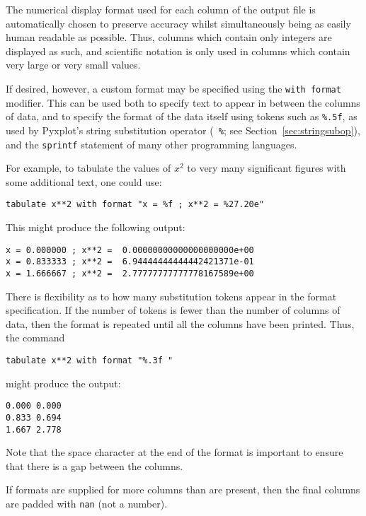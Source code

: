 The numerical display format used for each column of the output file is
automatically chosen to preserve accuracy whilst simultaneously being as easily
human readable as possible.  Thus, columns which contain only integers are
displayed as such, and scientific notation is only used in columns which
contain very large or very small values.

If desired, however, a custom format may be specified using the {\tt with
format} modifier. This can be used both to specify text to appear in between
the columns of data, and to specify the format of the data itself using tokens
such as {\tt \%.5f}, as used by Pyxplot's string substitution operator ({\tt
\%}; see Section~\ref{sec:stringsubop}), and the {\tt sprintf} statement of
many other programming languages.

For example, to tabulate the values of $x^2$ to very many significant figures
with some additional text, one could use:

\begin{verbatim}
tabulate x**2 with format "x = %f ; x**2 = %27.20e"
\end{verbatim}

\noindent This might produce the following output:

\begin{verbatim}
x = 0.000000 ; x**2 =  0.00000000000000000000e+00
x = 0.833333 ; x**2 =  6.94444444444442421371e-01
x = 1.666667 ; x**2 =  2.77777777777778167589e+00
\end{verbatim}

There is flexibility as to how many substitution tokens appear in the format
specification.  If the number of tokens is fewer than the number of columns of
data, then the format is repeated until all the columns have been printed.
Thus, the command

\begin{verbatim}
tabulate x**2 with format "%.3f "
\end{verbatim}

\noindent might produce the output:

\begin{verbatim}
0.000 0.000
0.833 0.694
1.667 2.778
\end{verbatim}

\noindent Note that the space character at the end of the format is important
to ensure that there is a gap between the columns.

If formats are supplied for more columns than are present, then the final
columns are padded with {\tt nan} (not a number).

